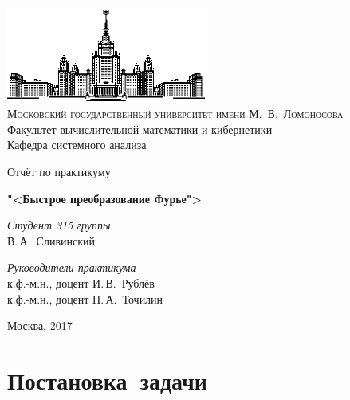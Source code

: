 \documentclass[11pt, oneside, draft]{article}
\numberwithin{equation}{section}
\begin{document}
\thispagestyle{empty}

\begin{center}
\ \vspace{-3cm}

\includegraphics[width=0.5\textwidth]{msu}\\
{\scshape Московский государственный университет имени М.~В.~Ломоносова}\\
Факультет вычислительной математики и кибернетики\\
Кафедра системного анализа

\vfill

{\LARGE Отчёт по практикуму}

\vspace{1cm}

{\Huge\bfseries "<Быстрое преобразование Фурье">}
\end{center}

\vspace{1cm}

\begin{flushright}
  \large
  \textit{Студент 315 группы}\\
  В.\,А.~Сливинский

  \vspace{5mm}

  \textit{Руководители практикума}\\
 	к.ф.-м.н., доцент И.\,В.~Рублёв \\
    	к.ф.-м.н., доцент П.\,А.~Точилин
\end{flushright}

\vfill

\begin{center}
Москва, 2017
\end{center}
\pagebreak
\tableofcontents

\pagebreak
\section{Постановка~задачи}
\end{document}
